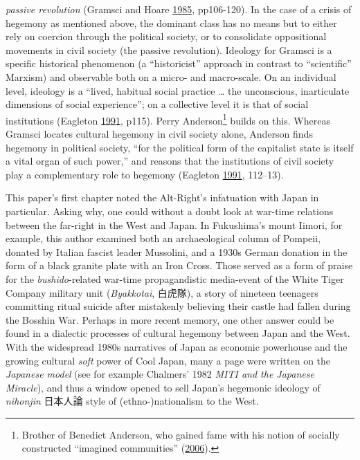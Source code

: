 \documentclass[10pt,british,A4paper,,openany]{memoir}
\begin{document}
\emph{passive revolution} (Gramsci and Hoare
\protect\hyperlink{ref-gramsci_selections_1985}{1985}, pp106-120). In
the case of a crisis of hegemony as mentioned above, the dominant class
has no means but to either rely on coercion through the political
society, or to consolidate oppositional movements in civil society (the
passive revolution). Ideology for Gramsci is a specific historical
phenomenon (a ``historicist'' approach in contrast to ``scientific''
Marxism) and observable both on a micro- and macro-scale. On an
individual level, ideology is a ``lived, habitual social practice
\ldots{} the unconscious, inarticulate dimensions of social
experience''; on a collective level it is that of social institutions
(Eagleton \protect\hyperlink{ref-eagleton_ideology:_1991}{1991}, p115).
Perry Anderson\footnote{Brother of Benedict Anderson, who gained fame
  with his notion of socially constructed ``imagined communities''
  (\protect\hyperlink{ref-anderson_imagined_2006}{2006}).} builds on
this. Whereas Gramsci locates cultural hegemony in civil society alone,
Anderson finds hegemony in political society, ``for the political form
of the capitalist state is itself a vital organ of such power,'' and
reasons that the institutions of civil society play a complementary role
to hegemony (Eagleton
\protect\hyperlink{ref-eagleton_ideology:_1991}{1991}, 112--13).

This paper's first chapter noted the Alt-Right's infatuation with Japan
in particular. Asking why, one could without a doubt look at war-time
relations between the far-right in the West and Japan. In Fukushima's
mount Iimori, for example, this author examined both an archaeological
column of Pompeii, donated by Italian fascist leader Mussolini, and a
1930s German donation in the form of a black granite plate with an Iron
Cross. Those served as a form of praise for the \emph{bushido}-related
war-time propagandistic media-event of the White Tiger Company military
unit (\emph{Byakkotai}, 白虎隊), a story of nineteen teenagers
committing ritual suicide after mistakenly believing their castle had
fallen during the Bosshin War. Perhaps in more recent memory, one other
answer could be found in a dialectic processes of cultural hegemony
between Japan and the West. With the widespread 1980s narratives of
Japan as economic powerhouse and the growing cultural \emph{soft} power
of Cool Japan, many a page were written on the \emph{Japanese model}
(see for example Chalmers' 1982 \emph{MITI and the Japanese Miracle}),
and thus a window opened to sell Japan's hegemonic ideology of
\emph{nihonjin} 日本人論 style of (ethno-)nationalism to the West.
\end{document}
